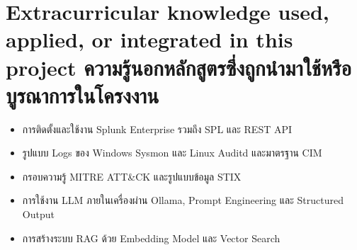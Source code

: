 \section{\ifenglish%
Extracurricular knowledge used, applied, or integrated in this project
\else%
ความรู้นอกหลักสูตรซึ่งถูกนำมาใช้หรือบูรณาการในโครงงาน
\fi
}
\begin{itemize}
  \item การติดตั้งและใช้งาน Splunk Enterprise รวมถึง SPL และ REST API
  \item รูปแบบ Logs ของ Windows Sysmon และ Linux Auditd และมาตรฐาน CIM
  \item กรอบความรู้ MITRE ATT\&CK และรูปแบบข้อมูล STIX
  \item การใช้งาน LLM ภายในเครื่องผ่าน Ollama, Prompt Engineering และ Structured Output
  \item การสร้างระบบ RAG ด้วย Embedding Model และ Vector Search
\end{itemize}
